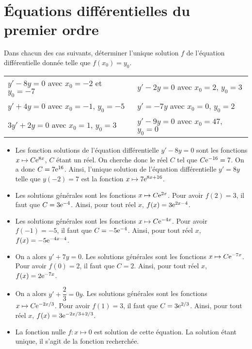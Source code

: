 \documentclass[11pt,fleqn, openany]{book} %
\begin{document}
\section*{Équations différentielles du premier ordre}


\begin{exercise}Dans chacun des cas suivants, déterminer l'unique solution $f$ de l'équation différentielle donnée telle que $f(x_0)=y_0$.

\renewcommand{\arraystretch}{1.2}
\begin{tabularx}{\linewidth}{XX}
$y'-8y=0$ avec $x_0=-2$ et $y_0=-7$
& $y'-2y=0$ avec $x_0=2$, $y_0=3$
\\ $y'+4y=0$ avec $x_0=-1$, $y_0=-5$
& $y'=-7y$ avec $x_0=0$, $y_0=2$
\\ $3y'+2y=0$ avec $x_0=1$, $y_0=3$
& $y'-9y=0$ avec $x_0=47$, $y_0=0$
\end{tabularx}\end{exercise}


\begin{solution} \hspace{0pt}

\begin{itemize}\item Les fonction solutions de l'équation différentielle \(y'-8y=0\) sont les fonctions \(x\mapsto C\mathrm{e}^{8x}\), \(C\) étant un réel. 
On cherche donc le réel \(C\) tel que \(C\mathrm{e}^{-16}=7\). On a donc \(C=7\mathrm{e}^{16}\). Ainsi, l'unique solution de l'équation différentielle \(y'=8y\) telle que \(y(-2)=7\) est la fonction \(x\mapsto 7\mathrm{e}^{8x+16}\).
\vskip5pt
\item Les solutions générales sont les fonctions \(x\mapsto C\mathrm{e}^{2x}\). Pour avoir \(f(2)=3\), il faut que \(C=3\mathrm{e}^{-4}\). Ainsi, pour tout réel \(x\), \(f(x)=3\mathrm{e}^{2x-4}\).
\vskip5pt
\item Les solutions générales sont les fonctions \(x\mapsto C\mathrm{e}^{-4x}\). Pour avoir \(f(-1)=-5\), il faut que \(C=-5\mathrm{e}^{-4}\). Ainsi, pour tout réel \(x\), \(f(x)=-5\mathrm{e}^{-4x-4}\).
\vskip5pt
\item  On a alors \(y'+7y=0\). Les solutions générales sont les fonctions \(x\mapsto C\mathrm{e}^{-7x}\). Pour avoir \(f(0)=2\), il faut que \(C=2\). Ainsi, pour tout réel \(x\), \(f(x)=2\mathrm{e}^{-7x}\).
\vskip5pt
\item On a alors \(y'+\dfrac{2}{3}=0y\). Les solutions générales sont les fonctions \(x\mapsto C\mathrm{e}^{-2x/3}\). Pour avoir \(f(1)=3\), il faut que \(C=3\mathrm{e}^{2/3}\). Ainsi, pour tout réel \(x\), \(f(x)=3\mathrm{e}^{-2x/3+2/3}\).
\vskip5pt
\item La fonction nulle \(f:x\mapsto 0\) est solution de cette équation. La solution étant unique, il s'agit de la fonction recherchée.

\end{itemize} \end{solution}
\end{document}
